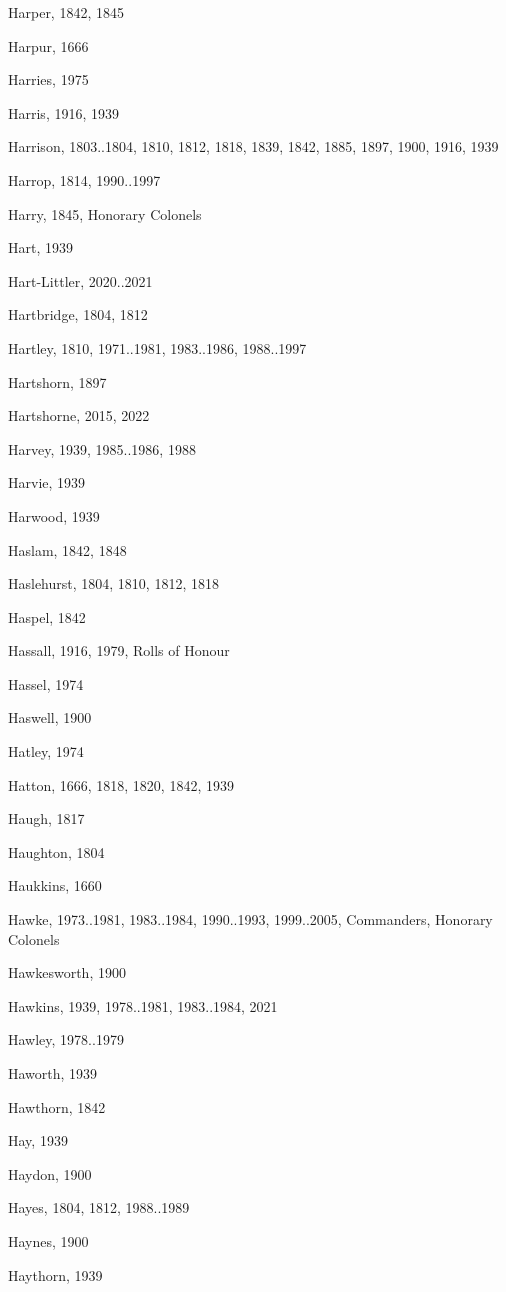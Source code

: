 \begin{theindex}
\item Harper, 1842, 1845
\item Harpur, 1666
\item Harries, 1975
\item Harris, 1916, 1939
\item Harrison, 1803..1804, 1810, 1812, 1818, 1839, 1842, 1885, 1897, 1900, 1916, 1939
\item Harrop, 1814, 1990..1997
\item Harry, 1845, Honorary Colonels
\item Hart, 1939
\item Hart-Littler, 2020..2021
\item Hartbridge, 1804, 1812
\item Hartley, 1810, 1971..1981, 1983..1986, 1988..1997
\item Hartshorn, 1897
\item Hartshorne, 2015, 2022
\item Harvey, 1939, 1985..1986, 1988
\item Harvie, 1939
\item Harwood, 1939
\item Haslam, 1842, 1848
\item Haslehurst, 1804, 1810, 1812, 1818
\item Haspel, 1842
\item Hassall, 1916, 1979, Rolls of Honour
\item Hassel, 1974
\item Haswell, 1900
\item Hatley, 1974
\item Hatton, 1666, 1818, 1820, 1842, 1939
\item Haugh, 1817
\item Haughton, 1804
\item Haukkins, 1660
\item Hawke, 1973..1981, 1983..1984, 1990..1993, 1999..2005, Commanders, Honorary Colonels
\item Hawkesworth, 1900
\item Hawkins, 1939, 1978..1981, 1983..1984, 2021
\item Hawley, 1978..1979
\item Haworth, 1939
\item Hawthorn, 1842
\item Hay, 1939
\item Haydon, 1900
\item Hayes, 1804, 1812, 1988..1989
\item Haynes, 1900
\item Haythorn, 1939

\end{theindex}
